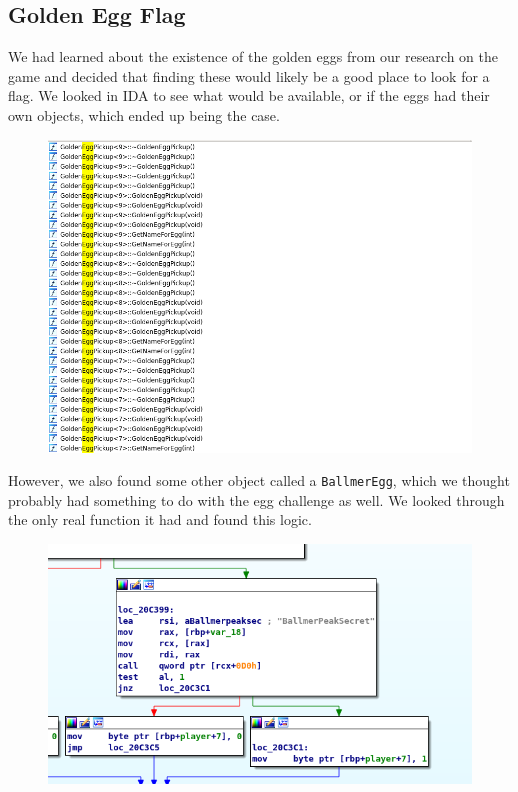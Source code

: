 \documentclass[11pt]{article}
\begin{document}
\subsection*{Golden Egg Flag}

We had learned about the existence of the golden eggs from our research on the game and decided that finding these would likely be a good place to look for a flag. We looked in IDA to see what would be available, or if the eggs had their own objects, which ended up being the case.

\begin{figure}[H]
    \centering
    \includegraphics[width=1.00\linewidth]{golden_class.png}
\end{figure}

However, we also found some other object called a \texttt{BallmerEgg}, which we thought probably had something to do with the egg challenge as well. We looked through the only real function it had and found this logic.

\begin{figure}[H]
    \centering
    \includegraphics[width=1.00\linewidth]{balmer_peak1.png}
\end{figure}
\end{document}
